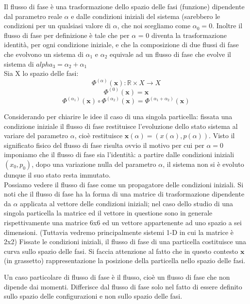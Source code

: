 \documentclass[
10pt, %
a4paper, %
oneside, %
headinclude,footinclude, %
BCOR5mm, %
]{scrartcl}
\begin{document}
\begin{definizione}
	Il flusso di fase è una trasformazione dello spazio delle fasi (funzione) dipendente dal parametro reale $\alpha$ e dalle condizioni iniziali del sistema (sarebbero le condizioni per un qualsiasi valore di $\alpha$, che noi scegliamo come \(\alpha_0 = 0\). Inoltre il flusso di fase per definizione è tale che per $\alpha$ = 0 diventa la trasformazione identità, per ogni condizione iniziale, e che la composizione di due flussi di fase che evolvono un sistema di $\alpha_1$ e $\alpha_2$ equivale ad un flusso di fase che evolve il sistema di \(alpha_3 = \alpha_2 + \alpha_1\) \\
	Sia X lo spazio delle fasi:
	\[\Phi^{(\alpha)}(\mathbf{x}): \mathbb{R}\times X\rightarrow X\]
	\[\Phi^{(0)}(\mathbf{x}) = \mathbf{x}\]
	\[\Phi^{(\alpha_1)}(\mathbf{x})\circ \Phi^{(\alpha_2)}(\mathbf{x}) = \Phi^{(\alpha_1+\alpha_2)}(\mathbf{x})\]
\end{definizione}
	Considerando per chiarire le idee il caso di una singola particella: fissata una condizione iniziale il flusso di fase restituisce l'evoluzione dello stato sistema al variare del parametro $\alpha$, cioè restituisce \(\mathbf{x}(\alpha) = (x(\alpha), p(\alpha))\). Visto il significato fisico del flusso di fase risulta ovvio il motivo per cui per $\alpha = 0$ imponiamo che il flusso di fase sia l'identità: a partire dalle condizioni iniziali \((x_0, p_0)\), dopo una variazione nulla del parametro $\alpha$, il sistema non si è evoluto dunque il suo stato resta immutato.\\
	Possiamo vedere il flusso di fase come un propagatore delle condizioni iniziali. Si noti che il flusso di fase ha la forma di una matrice di trasformazione dipendente da $\alpha$ applicata al vettore delle condizioni iniziali; nel caso dello studio di una singola particella la matrice ed il vettore in questione sono in generale rispettivamente una matrice 6x6 ed un vettore appartenente ad uno spazio a sei dimensioni. (Tuttavia vedremo principalmente sistemi 1-D in cui la matrice è 2x2)
	Fissate le condizioni iniziali, il flusso di fase di una particella costituisce una curva sullo spazio delle fasi. Si faccia attenzione al fatto che in questo contesto $\mathbf{x}$ (in grassetto) rappresentazione la posizione della particella nello spazio delle fasi.
\begin{definizione}[Flusso]\label{def:flusso}
	Un caso particolare di flusso di fase è il flusso, cioè un flusso di fase che non dipende dai momenti. Differisce dal flusso di fase solo nel fatto di essere definito sullo spazio delle configurazioni e non sullo spazio delle fasi.
\end{definizione}
\end{document}
